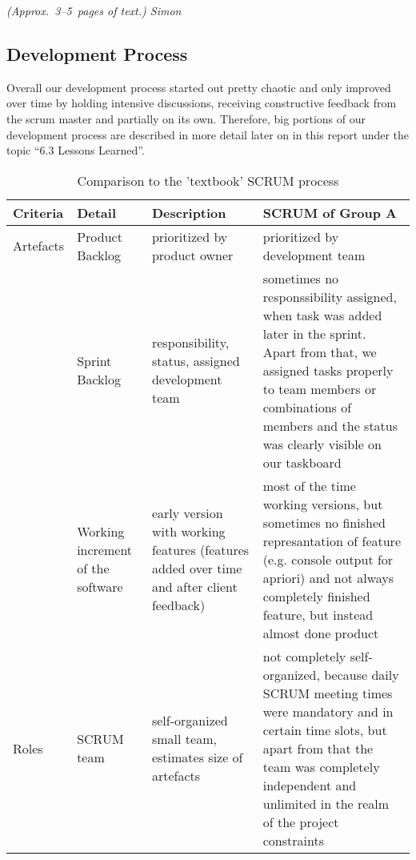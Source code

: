 \emph{(Approx.~3--5~pages of text.) Simon}

\subsection{Development Process}

Overall our development process started out pretty chaotic and only improved over time by holding intensive discussions, receiving constructive feedback from the scrum master and partially on its own. Therefore, big portions of our development process are described in more detail later on in this report under the topic “6.3 Lessons Learned”.

\begin{table}[!h]
  \caption{Comparison to the 'textbook' SCRUM process}
  \centering
  \begin{tabular}{|p{1.5cm}|p{2cm}|p{4cm}|p{4cm}|}
    Criteria & Detail & Description & SCRUM of Group A\\
    \hline
    \hline
    Artefacts & Product Backlog & prioritized by product owner & prioritized by development team \\
    \hline
      & Sprint Backlog & responsibility, status, assigned development team & sometimes no responssibility assigned, when task was added later in the sprint. Apart from that, we assigned tasks properly to team members or combinations of members and the status was clearly visible on our taskboard\\
    \hline
      & Working increment of the software & early version with working features (features added over time and after client feedback) & most of the time working versions, but sometimes no finished represantation of feature (e.g. console output for apriori) and not always completely finished feature, but instead almost done product \\
    \hline
    Roles & SCRUM team & self-organized small team, estimates size of artefacts & not completely self-organized, because daily SCRUM meeting times were mandatory and in certain time slots, but apart from that the team was completely independent and unlimited in the realm of the project constraints \\
    \hline
    \hline
  \end{tabular}
\end{table}    
\newpage
